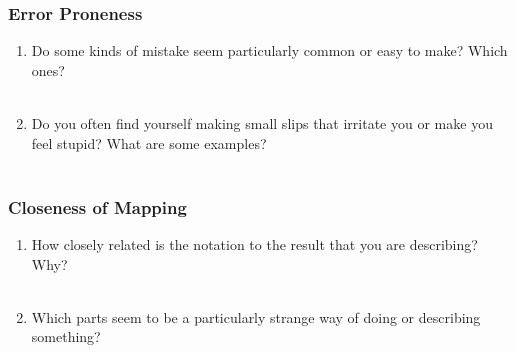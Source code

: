 \documentclass[14pt]{article}
\newcommand{\answerbox}{
\fbox{
\begin{minipage}{16cm}
\hfill\vspace{2cm}
\end{minipage}
}\\
}
\begin{document}
%

%

\subsubsection{Error Proneness}

\begin{enumerate}
\item Do some kinds of mistake seem particularly common or easy to make? Which ones?\\
\answerbox
\item Do you often find yourself making small slips that irritate you or make you feel stupid? What are some examples?\\
\answerbox
\end{enumerate}

\subsubsection{Closeness of Mapping}

\begin{enumerate}
\item How closely related is the notation to the result that you are describing? Why?\\ %
\answerbox


\item Which parts seem to be a particularly strange way of doing or describing something?\\
\answerbox
\end{enumerate}
\end{document}
